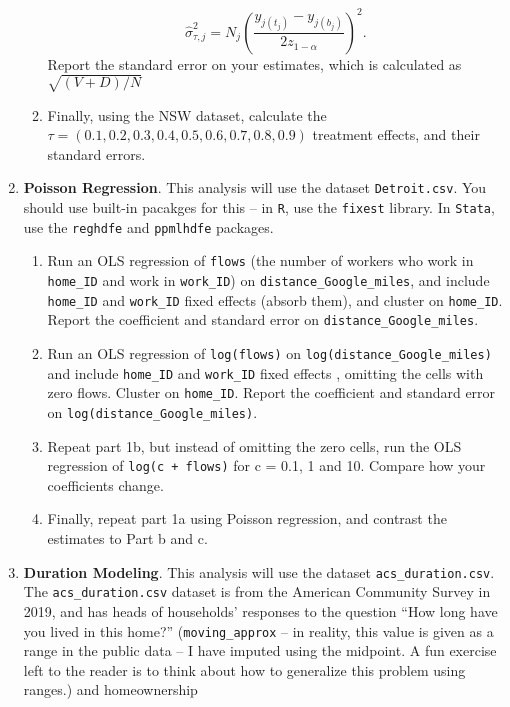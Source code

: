 \documentclass[11pt, a4paper]{article}
\begin{document}
\begin{enumerate}
\begin{enumerate}
\begin{equation}
  \hat{\sigma}^{2}_{\tau,j} = N_{j}\left(\frac{y_{j(t_{j})}-y_{j(b_{j})}}{2 z_{1-\alpha}}\right)^{2}.
\end{equation}
Report the standard error on your estimates, which is calculated as $\sqrt{(V+D)/N}$
\item Finally, using the NSW dataset, calculate the
  $\tau = (0.1,0.2,0.3,0.4,0.5,0.6,0.7,0.8,0.9)$ treatment effects, and their
  standard errors.
\end{enumerate}
\item \textbf{Poisson Regression}. This analysis will use the dataset
  \texttt{Detroit.csv}. You should use built-in pacakges for this --
  in \texttt{R}, use the \texttt{fixest} library. In \texttt{Stata},
  use the \texttt{reghdfe} and \texttt{ppmlhdfe} packages.
  \begin{enumerate}
  \item Run an OLS regression of \texttt{flows} (the number of workers
    who work in \texttt{home\_ID} and work in \texttt{work\_ID}) on
    \texttt{distance\_Google\_miles}, and include \texttt{home\_ID} and
    \texttt{work\_ID} fixed effects (absorb them), and cluster on
    \texttt{home\_ID}. Report the coefficient and standard error on
    \texttt{distance\_Google\_miles}.
  \item Run an OLS regression of \texttt{log(flows)} on
    \texttt{log(distance\_Google\_miles)} and include \texttt{home\_ID}
    and \texttt{work\_ID} fixed effects , omitting the cells with zero
    flows. Cluster on \texttt{home\_ID}. Report the coefficient and
    standard error on \texttt{log(distance\_Google\_miles)}.
  \item Repeat part 1b, but instead of omitting the zero cells, run
    the OLS regression of \texttt{log(c + flows)} for c = 0.1, 1 and
    10. Compare how your coefficients change. 
  \item Finally, repeat part 1a using Poisson regression, and contrast
    the estimates to Part b and c.
  \end{enumerate}
\item \textbf{Duration Modeling}. This analysis will use the dataset
  \texttt{acs\_duration.csv}. The
  \texttt{acs\_duration.csv} dataset is from the American Community
  Survey in 2019, and has heads of households' responses to the
  question ``How long have you lived in this home?''
  (\texttt{moving\_approx}  -- in reality, this value is given as
    a range in the public data -- I have imputed using the midpoint. A
    fun exercise left to the reader is to think about how to
    generalize this problem using ranges.) and homeownership

\end{enumerate}
\end{document}
